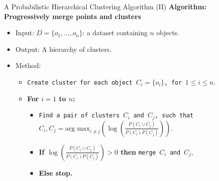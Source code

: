 \begin{frame}{A Probabilistic Hierarchical Clustering Algorithm (II)}
  \textbf{Algorithm: Progressively merge points and clusters}
  \begin{itemize}
  \item Input: $D = \{o_1, \ldots, o_n\}$: a dataset containing $n$
    objects.
  \item Output: A hierarchy of clusters.
  \item Method:
    \begin{itemize}
    \item \texttt{Create cluster for each object $C_i = \{o_i\}$,
        for $1 \leq i \leq n$}.
    \item \textbf{For $i=1$ to $n$:}
      \begin{itemize}
      \item \texttt{Find a pair of clusters $C_i$ and $C_j$, such
          that}\\
        $C_i, C_j = \text{arg max}_{i \neq j} \left( \log\left(
            \frac{P(C_i \cup C_j)}{P(C_i)P(C_j)} \right) \right)$.
      \item \textbf{If $\log\left( \frac{P(C_i \cup
              C_j)}{P(C_i)P(C_j)}\right) > 0$ then} \texttt{merge $C_i$
          and $C_j$},
      \item \textbf{Else stop.}
      \end{itemize}
    \end{itemize}
  \end{itemize}
\end{frame}
